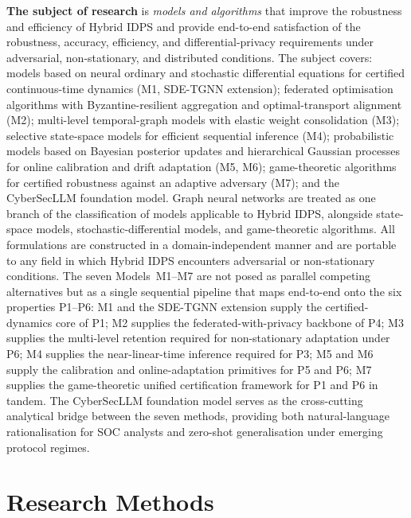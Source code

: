 \textbf{The subject of research} is \emph{models and algorithms} that improve the robustness and efficiency of Hybrid IDPS and provide end-to-end satisfaction of the robustness, accuracy, efficiency, and differential-privacy requirements under adversarial, non-stationary, and distributed conditions. The subject covers: models based on neural ordinary and stochastic differential equations for certified continuous-time dynamics (M1, SDE-TGNN extension); federated optimisation algorithms with Byzantine-resilient aggregation and optimal-transport alignment (M2); multi-level temporal-graph models with elastic weight consolidation (M3); selective state-space models for efficient sequential inference (M4); probabilistic models based on Bayesian posterior updates and hierarchical Gaussian processes for online calibration and drift adaptation (M5, M6); game-theoretic algorithms for certified robustness against an adaptive adversary (M7); and the CyberSecLLM foundation model. Graph neural networks are treated as one branch of the classification of models applicable to Hybrid IDPS, alongside state-space models, stochastic-differential models, and game-theoretic algorithms. All formulations are constructed in a domain-independent manner and are portable to any field in which Hybrid IDPS encounters adversarial or non-stationary conditions. The seven Models~M1--M7 are not posed as parallel competing alternatives but as a single sequential pipeline that maps end-to-end onto the six properties P1--P6: M1 and the SDE-TGNN extension supply the certified-dynamics core of P1; M2 supplies the federated-with-privacy backbone of P4; M3 supplies the multi-level retention required for non-stationary adaptation under P6; M4 supplies the near-linear-time inference required for P3; M5 and M6 supply the calibration and online-adaptation primitives for P5 and P6; M7 supplies the game-theoretic unified certification framework for P1 and P6 in tandem. The CyberSecLLM foundation model serves as the cross-cutting analytical bridge between the seven methods, providing both natural-language rationalisation for SOC analysts and zero-shot generalisation under emerging protocol regimes.

\section*{Research Methods}

